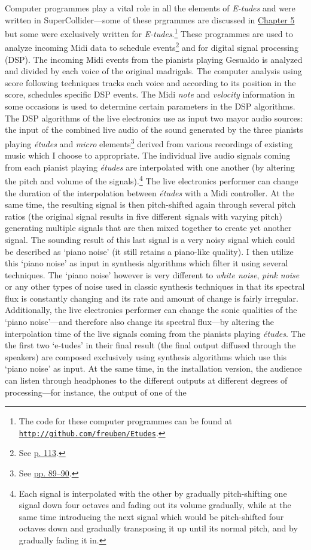 Computer programmes play a vital role in all the elements of \emph{E-tudes} and were written in SuperCollider---some of these prgrammes are discussed in \hyperlink{chapter5}{Chapter 5} but some were exclusively written for \emph{E-tudes}.\footnote{The code for these computer programmes can be found at \href{http://github.com/freuben/Etudes}{\texttt {http://github.com/freuben/Etudes}}.} These programmes are used to analyze incoming Midi data to schedule events\footnote{See \hyperlink{miditrig}{p. 113}.} and for digital signal processing (DSP). The incoming Midi events from the pianists playing Gesualdo is analyzed and divided by each voice of the original madrigals. The computer analysis using score following techniques tracks each voice and according to its position in the score, schedules specific DSP events. The Midi \emph{note} and \emph{velocity} information in some occasions is used to determine certain parameters in the DSP algorithms. The DSP algorithms of the live electronics use as input two mayor audio sources: the input of the combined live audio of the sound generated by the three pianists playing \emph{\'{e}tudes} and \emph{micro} elements\footnote{See \hyperlink{macroplunder}{pp. 89--90}.} derived from various recordings of existing music which I choose to appropriate. The individual live audio signals coming from each pianist playing \emph{\'{e}tudes} are interpolated with one another (by altering the pitch and volume of the signals).\footnote{Each signal is interpolated with the other by gradually pitch-shifting one signal down four octaves and fading out its volume gradually, while at the same time introducing the next signal which would be pitch-shifted four octaves down and gradually transposing it up until its normal pitch, and by gradually fading it in.} The live electronics performer can change the duration of the interpolation between \emph{\'{e}tudes} with a Midi controller. At the same time, the resulting signal is then pitch-shifted again through several pitch ratios (the original signal results in five different signals with varying pitch) generating multiple signals that are then mixed together to create yet another signal. The sounding result of this last signal is a very noisy signal which could be described as `piano noise' (it still retains a piano-like quality). I then utilize this `piano noise' as input in synthesis algorithms which filter it using several techniques. The `piano noise' however is very different to \emph{white noise}, \emph{pink noise} or any other types of noise used in classic synthesis techniques in that its spectral flux is constantly changing and its rate and amount of change is fairly irregular. Additionally, the live electronics performer can change the sonic qualities of the `piano noise'---and therefore also change its spectral flux---by altering the interpolation time of the live signals coming from the pianists playing \emph{\'{e}tudes}. The the first two `e-tudes' in their final result (the final output diffused through the speakers) are composed exclusively using synthesis algorithms which use this `piano noise' as input. At the same time, in the installation version, the audience can listen through headphones to the different outputs at different degrees of processing---for instance, the output of one of the 